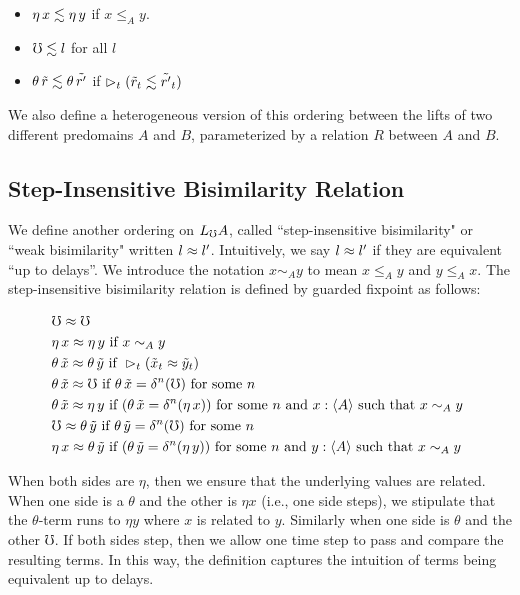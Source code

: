\begin{itemize}
  \item 	$\eta\, x \lesssim \eta\, y$ if $x \le_A y$.
  \item 	$\mho \lesssim l$ for all $l$ 
  \item   $\theta\, \tilde{r} \lesssim \theta\, \tilde{r'}$ if
          $\vartriangleright_t (\tilde{r}_t \lesssim \tilde{r'}_t)$
\end{itemize}

We also define a heterogeneous version of this ordering between the lifts of two
different predomains $A$ and $B$, parameterized by a relation $R$ between $A$ and $B$.

\subsection{Step-Insensitive Bisimilarity Relation}

We define another ordering on $L_\mho A$, called ``step-insensitive bisimilarity"
or ``weak bisimilarity" written $l \approx l'$.
Intuitively, we say $l \approx l'$ if they are equivalent ``up to delays''.
We introduce the notation $x \sim_A y$ to mean $x \le_A y$ and $y \le_A x$.
%
The step-insensitive bisimilarity relation is defined by guarded fixpoint as follows:

\begin{align*}
  &\mho \bisim \mho \\
%
  &\eta\, x \bisim \eta\, y \text{ if } 
    x \sim_A y \\
%		
  &\theta\, \tilde{x} \bisim \theta\, \tilde{y} \text{ if } 
    \later_t (\tilde{x}_t \bisim \tilde{y}_t) \\
%	
  &\theta\, \tilde{x} \bisim \mho \text{ if } 
    \theta\, \tilde{x} = \delta^n(\mho) \text { for some $n$ } \\
%	
  &\theta\, \tilde{x} \bisim \eta\, y \text{ if }
    (\theta\, \tilde{x} = \delta^n(\eta\, x))
  \text { for some $n$ and $x : \ty{A}$ such that $x \sim_A y$ } \\
%
  &\mho \bisim \theta\, \tilde{y} \text { if } 
    \theta\, \tilde{y} = \delta^n(\mho) \text { for some $n$ } \\
%	
  &\eta\, x \bisim \theta\, \tilde{y} \text { if }
    (\theta\, \tilde{y} = \delta^n (\eta\, y))
  \text { for some $n$ and $y : \ty{A}$ such that $x \sim_A y$ }
\end{align*}

When both sides are $\eta$, then we ensure that the underlying values are related.
When one side is a $\theta$ and the other is $\eta x$ (i.e., one side steps),
we stipulate that the $\theta$-term runs to $\eta y$ where $x$ is related to $y$.
Similarly when one side is $\theta$ and the other $\mho$.
If both sides step, then we allow one time step to pass and compare the resulting terms.
In this way, the definition captures the intuition of terms being equivalent up to
delays.

